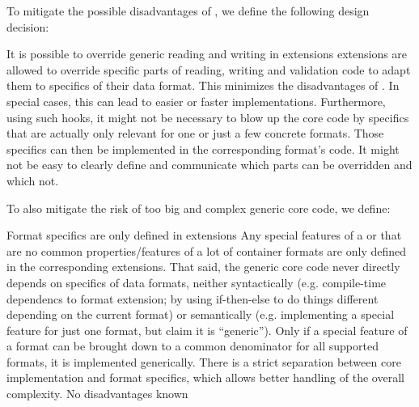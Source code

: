 To mitigate the possible disadvantages of , we define the following design decision:


{%
It is possible to override generic reading and writing in extensions
}
{%
\LibName{} \TERMcontainerFormat{} extensions are allowed to override specific parts of reading, writing and validation code to adapt them to specifics of their data format.
}
{%
This minimizes the disadvantages of . In special cases, this can lead to easier or faster implementations. Furthermore, using such hooks, it might not be necessary to blow up the core code by specifics that are actually only relevant for one or just a few concrete formats. Those specifics can then be implemented in the corresponding format's code.
}
{%
It might not be easy to clearly define and communicate which parts can be overridden and which not.
}

To also mitigate the risk of too big and complex generic core code, we define:


{%
Format specifics are only defined in extensions
}
{%
Any special features of a \TERMcontainerFormat{} or \TERMmetadataFormat{} that are no common properties/features of a lot of container formats are only defined in the corresponding extensions. That said, the generic core code never directly depends on specifics of data formats, neither syntactically (e.g. compile-time dependencs to format extension; by using if-then-else to do things different depending on the current format) or semantically (e.g. implementing a special feature for just one format, but claim it is ``generic''). Only if a special feature of a format can be brought down to a common denominator for all supported formats, it is implemented generically.
}
{%
There is a strict separation between core implementation and format specifics, which allows better handling of the overall complexity.
}
{%
No disadvantages known
}


